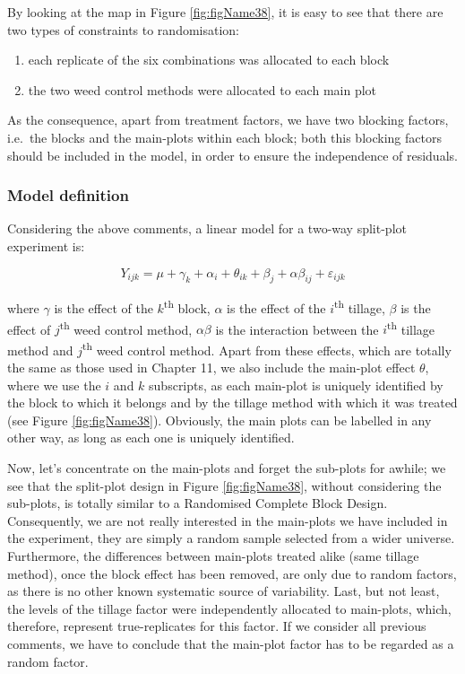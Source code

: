 \documentclass[a4paper,12pt,oneside]{book}
\providecommand{\tightlist}{%
  \setlength{\itemsep}{0pt}\setlength{\parskip}{0pt}}
\begin{document}
By looking at the map in Figure \ref{fig:figName38}, it is easy to see that there are two types of constraints to randomisation:

\begin{enumerate}
\def\labelenumi{\arabic{enumi}.}
\tightlist
\item
  each replicate of the six combinations was allocated to each block
\item
  the two weed control methods were allocated to each main plot
\end{enumerate}

As the consequence, apart from treatment factors, we have two blocking factors, i.e.~the blocks and the main-plots within each block; both this blocking factors should be included in the model, in order to ensure the independence of residuals.

\hypertarget{model-definition-4}{%
\subsubsection{Model definition}\label{model-definition-4}}

Considering the above comments, a linear model for a two-way split-plot experiment is:

\[Y_{ijk} = \mu + \gamma_k + \alpha_i + \theta_{ik} + \beta_j + \alpha\beta_{ij} + \varepsilon_{ijk}\]

where \(\gamma\) is the effect of the \(k\)\textsuperscript{th} block, \(\alpha\) is the effect of the \(i\)\textsuperscript{th} tillage, \(\beta\) is the effect of \(j\)\textsuperscript{th} weed control method, \(\alpha\beta\) is the interaction between the \(i\)\textsuperscript{th} tillage method and \(j\)\textsuperscript{th} weed control method. Apart from these effects, which are totally the same as those used in Chapter 11, we also include the main-plot effect \(\theta\), where we use the \(i\) and \(k\) subscripts, as each main-plot is uniquely identified by the block to which it belongs and by the tillage method with which it was treated (see Figure \ref{fig:figName38}). Obviously, the main plots can be labelled in any other way, as long as each one is uniquely identified.

Now, let's concentrate on the main-plots and forget the sub-plots for awhile; we see that the split-plot design in Figure \ref{fig:figName38}, without considering the sub-plots, is totally similar to a Randomised Complete Block Design. Consequently, we are not really interested in the main-plots we have included in the experiment, they are simply a random sample selected from a wider universe. Furthermore, the differences between main-plots treated alike (same tillage method), once the block effect has been removed, are only due to random factors, as there is no other known systematic source of variability. Last, but not least, the levels of the tillage factor were independently allocated to main-plots, which, therefore, represent true-replicates for this factor. If we consider all previous comments, we have to conclude that the main-plot factor has to be regarded as a random factor.
\end{document}

